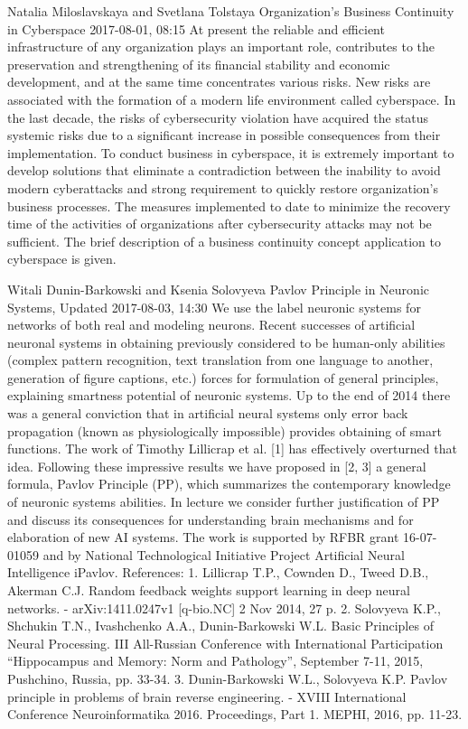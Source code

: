 \documentclass[10pt,fleqn,openany]{book} %
\begin{document}
\begin{enumerate}
		
		\paperabstract
		{Natalia Miloslavskaya and Svetlana Tolstaya}
		{Organization's Business Continuity in Cyberspace}
		{2017-08-01, 08:15}
		{At present the reliable and efficient infrastructure of any organization plays an important role, contributes to the preservation and strengthening of its financial stability and economic development, and at the same time concentrates various risks. New risks are associated with the formation of a modern life environment called cyberspace. In the last decade, the risks of cybersecurity violation have acquired the status systemic risks due to a significant increase in possible consequences from their implementation. To conduct business in cyberspace, it is extremely important to develop solutions that eliminate a contradiction between the inability to avoid modern cyberattacks and strong requirement to quickly restore organization's business processes. The measures implemented to date to minimize the recovery time of the activities of organizations after cybersecurity attacks may not be sufficient. The brief description of a business continuity concept application to cyberspace is given.}
		
		
		\paperabstract
		{Witali Dunin-Barkowski and Ksenia Solovyeva}
		{Pavlov Principle in Neuronic Systems, Updated}
		{2017-08-03, 14:30}
		{We use the label neuronic systems for networks of both real and modeling neurons. Recent successes of artificial neuronal systems in obtaining previously considered to be human-only abilities (complex pattern recognition,  text translation from one language to another, generation of figure captions, etc.) forces for formulation of general principles, explaining smartness potential of neuronic systems. Up to the end of 2014 there was a general conviction that in artificial neural systems only error back propagation (known as physiologically impossible) provides obtaining of smart functions. The work of Timothy Lillicrap et al. [1] has effectively overturned that idea. Following these impressive results we have proposed in [2, 3] a general formula, Pavlov Principle (PP), which summarizes the contemporary knowledge of neuronic systems abilities. In lecture we consider further justification of PP  and discuss its consequences for understanding brain mechanisms and for elaboration of new AI systems.  The work is supported by RFBR grant 16-07-01059 and by National Technological Initiative Project Artificial Neural Intelligence iPavlov.  References: 1. Lillicrap T.P., Cownden D., Tweed D.B., Akerman C.J. Random feedback weights support learning in deep neural networks. - arXiv:1411.0247v1 [q-bio.NC] 2 Nov 2014, 27 p.  2.  Solovyeva K.P., Shchukin T.N., Ivashchenko A.A., Dunin-Barkowski W.L. Basic Principles of Neural Processing.  III All-Russian Conference with International Participation ``Hippocampus and Memory: Norm and Pathology'', September 7-11, 2015, Pushchino, Russia, pp. 33-34. 3. Dunin-Barkowski W.L., Solovyeva K.P. Pavlov principle in problems of brain reverse engineering. - XVIII International Conference Neuroinformatika 2016. Proceedings, Part 1. MEPHI, 2016, pp. 11-23.}
		

\end{enumerate}
\end{document}
